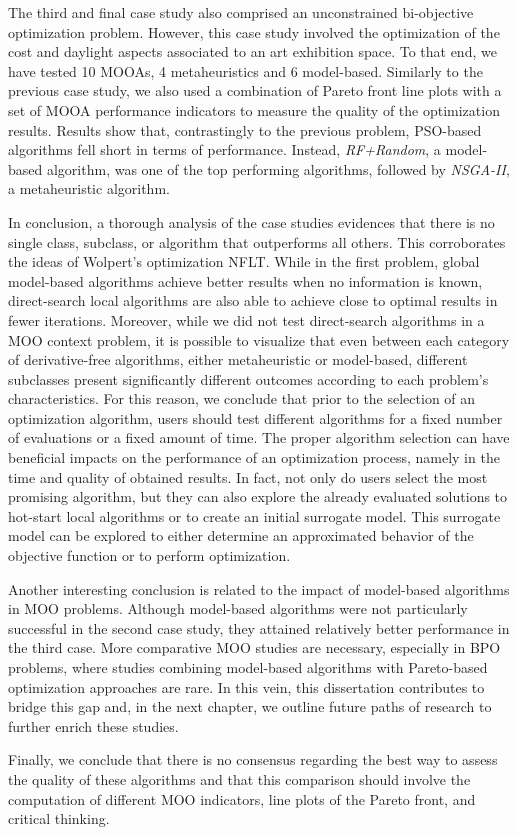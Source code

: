 The third and final case study also comprised an unconstrained bi-objective optimization problem. However, this case study involved the optimization of the cost and daylight aspects associated to an art exhibition space. To that end, we have tested 10 \acp{MOOA}, 4 metaheuristics and 6 model-based. Similarly to the previous case study, we also used a combination of Pareto front line plots with a set of \ac{MOOA} performance indicators to measure the quality of the optimization results. Results show that, contrastingly to the previous problem, \ac{PSO}-based algorithms fell short in terms of performance. Instead, \textit{RF+Random}, a model-based algorithm, was one of the top performing algorithms, followed by \textit{\ac{NSGA-II}}, a metaheuristic algorithm. 

In conclusion, a thorough analysis of the case studies evidences that there is no single class, subclass, or algorithm that outperforms all others. This corroborates the ideas of Wolpert's optimization \ac{NFLT}\cite{Wolpert1997NFLT}. While in the first problem, global model-based algorithms achieve better results when no information is known, direct-search local algorithms are also able to achieve close to optimal results in fewer iterations. Moreover, while we did not test direct-search algorithms in a \ac{MOO} context problem, it is possible to visualize that even between each category of derivative-free algorithms, either metaheuristic or model-based, different subclasses present significantly different outcomes according to each problem's characteristics. For this reason, we conclude that prior to the selection of an optimization algorithm, users should test different algorithms for a fixed number of evaluations or a fixed amount of time. The proper algorithm selection can have beneficial impacts on the performance of an optimization process, namely in the time and quality of obtained results. In fact, not only do users select the most promising algorithm, but they can also explore the already evaluated solutions to hot-start local algorithms or to create an initial surrogate model. This surrogate model can be explored to either determine an approximated behavior of the objective function or to perform optimization. 

Another interesting conclusion is related to the impact of model-based algorithms in \ac{MOO} problems. Although model-based algorithms were not particularly successful in the second case study, they attained relatively better performance in the third case. More comparative \ac{MOO} studies are necessary, especially in \ac{BPO} problems, where studies combining model-based algorithms with Pareto-based optimization approaches are rare. In this vein, this dissertation contributes to bridge this gap and, in the next chapter, we outline future paths of research to further enrich these studies.

Finally, we conclude that there is no consensus regarding the best way to assess the quality of these algorithms and that this comparison should involve the computation of different \ac{MOO} indicators, line plots of the Pareto front, and critical thinking. 